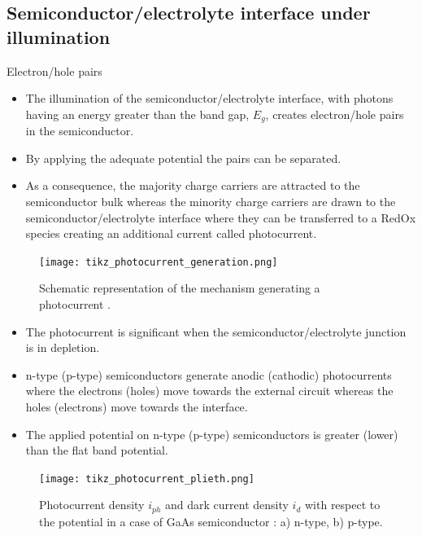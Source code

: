 \documentclass[10pt,compress]{beamer}
\begin{document}
\subsection{Semiconductor/electrolyte interface under illumination}
    \begin{frame}[allowframebreaks=1.0]{Electron/hole pairs}
    \begin{itemize} 
        \item The illumination of the semiconductor/electrolyte interface, 
        with photons having an energy greater than the band gap, $E_g$, creates 
        electron/hole pairs in the semiconductor. 
        \item By applying the adequate potential the pairs can be separated. 
        \item As a consequence, the majority charge carriers are attracted to the 
        semiconductor bulk whereas the minority charge carriers are drawn to the 
        semiconductor/electrolyte interface where they can be transferred to a RedOx 
        species creating an additional current called photocurrent. 
    \end{itemize}
    
    \begin{figure}[h]
        \centering
        \texttt{[image: tikz\_photocurrent\_generation.png]}
        \caption{Schematic representation of the mechanism generating 
        a photocurrent \citep{memming2008,bard2002}.}
        \label{fig_photocurrent_generation}
    \end{figure}
    
    \begin{itemize}
        \item The photocurrent is significant when the semiconductor/electrolyte junction 
        is in depletion. 
        \item n-type (p-type) 
        semiconductors generate anodic (cathodic) photocurrents where the 
        electrons (holes) move towards the external circuit whereas the holes (electrons) 
        move towards the interface. 
        \item The applied potential on n-type (p-type) semiconductors is 
        greater (lower) than the flat band potential. 
    \end{itemize}

    \begin{figure}[h]
        \centering
        \texttt{[image: tikz\_photocurrent\_plieth.png]}
        \caption{Photocurrent density $i_{ph}$ and dark current density 
        $i_d$ with respect to the potential in a case of GaAs semiconductor 
        \citep{plieth2008}: a) n-type, b) p-type.}
        \label{fig_photocurrent_plieth}
    \end{figure}

    \end{frame}
\end{document}
